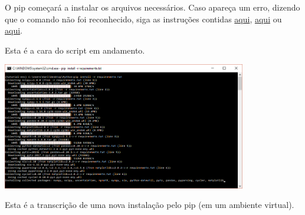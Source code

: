 \documentclass[a4paper, 12pt]{article}
\begin{document}
O pip começará a instalar os arquivos necessários. Caso apareça um erro, dizendo que o comando não foi reconhecido, siga as instruções contidas \href{https://docs.python.org/3/using/windows.html}{aqui},  \href{https://stackoverflow.com/questions/3701646/how-to-add-to-the-pythonpath-in-windows-7}{aqui} ou \href{https://matthewhorne.me/how-to-install-python-and-pip-on-windows-10/}{aqui}.

Esta é a cara do script em andamento.

\begin{center}
\includegraphics[width = 0.8\textwidth]{pip}
\end{center}

Esta é a transcrição de uma nova instalação pelo pip (em um ambiente virtual). 
\end{document}
